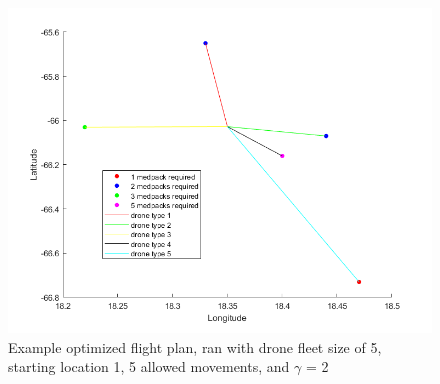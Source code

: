 \documentclass[twocolumn,10pt]{asme2ej}
\begin{document}
\begin{figure}
	\centering
	\includegraphics[width=0.7\linewidth]{../example_flight_plan}
	\caption[Fig 1.]{Example optimized flight plan, ran with drone fleet size of 5, starting location 1, 5 allowed movements, and $\gamma$ = 2}
	\label{Fig 1.}
\end{figure}
\end{document}
